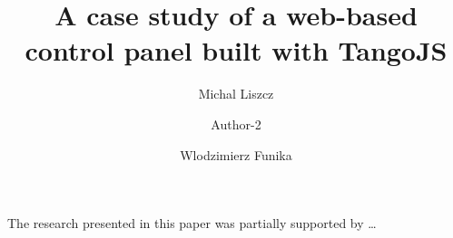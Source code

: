 \documentclass[10pt]{article}
\begin{document}
\begin{opening}

\title{A case study of a web-based control panel built with TangoJS}

\author[Institution, address, the first author's e-mail address]{Michal Liszcz}

\author[Institution, address, the second author's e-mail address]{Author-2}

\author[Institution1, address1, the fourth author's e-mail address1
        Institution2, address2, the fourth author's e-mail address2,]{Wlodzimierz Funika}

\begin{abstract}
    
\end{abstract}


\end{opening}

\tikzset{font=\Large}



\begin{acknowledgements}
 The research presented in this paper was partially supported by \ldots
\end{acknowledgements}




\end{document}
